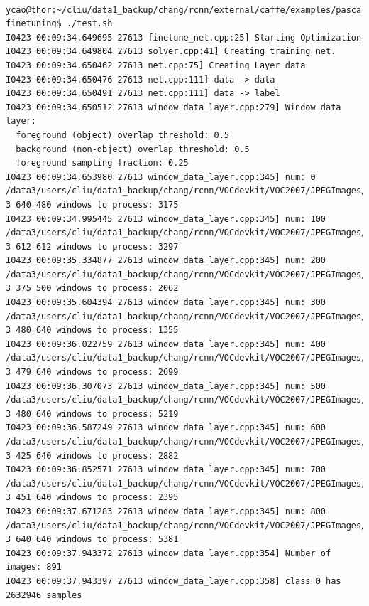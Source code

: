 \documentclass[a4]{article}
\begin{document}
\begin{lstlisting}

ycao@thor:~/cliu/data1_backup/chang/rcnn/external/caffe/examples/pascal-finetuning$ ./test.sh 
I0423 00:09:34.649695 27613 finetune_net.cpp:25] Starting Optimization
I0423 00:09:34.649804 27613 solver.cpp:41] Creating training net.
I0423 00:09:34.650462 27613 net.cpp:75] Creating Layer data
I0423 00:09:34.650476 27613 net.cpp:111] data -> data
I0423 00:09:34.650491 27613 net.cpp:111] data -> label
I0423 00:09:34.650512 27613 window_data_layer.cpp:279] Window data layer:
  foreground (object) overlap threshold: 0.5
  background (non-object) overlap threshold: 0.5
  foreground sampling fraction: 0.25
I0423 00:09:34.653980 27613 window_data_layer.cpp:345] num: 0 /data3/users/cliu/data1_backup/chang/rcnn/VOCdevkit/VOC2007/JPEGImages/COCO_val2014_000000015953.jpg 3 640 480 windows to process: 3175
I0423 00:09:34.995445 27613 window_data_layer.cpp:345] num: 100 /data3/users/cliu/data1_backup/chang/rcnn/VOCdevkit/VOC2007/JPEGImages/COCO_val2014_000000067686.jpg 3 612 612 windows to process: 3297
I0423 00:09:35.334877 27613 window_data_layer.cpp:345] num: 200 /data3/users/cliu/data1_backup/chang/rcnn/VOCdevkit/VOC2007/JPEGImages/COCO_val2014_000000134278.jpg 3 375 500 windows to process: 2062
I0423 00:09:35.604394 27613 window_data_layer.cpp:345] num: 300 /data3/users/cliu/data1_backup/chang/rcnn/VOCdevkit/VOC2007/JPEGImages/COCO_val2014_000000206579.jpg 3 480 640 windows to process: 1355
I0423 00:09:36.022759 27613 window_data_layer.cpp:345] num: 400 /data3/users/cliu/data1_backup/chang/rcnn/VOCdevkit/VOC2007/JPEGImages/COCO_val2014_000000265822.jpg 3 479 640 windows to process: 2699
I0423 00:09:36.307073 27613 window_data_layer.cpp:345] num: 500 /data3/users/cliu/data1_backup/chang/rcnn/VOCdevkit/VOC2007/JPEGImages/COCO_val2014_000000331817.jpg 3 480 640 windows to process: 5219
I0423 00:09:36.587249 27613 window_data_layer.cpp:345] num: 600 /data3/users/cliu/data1_backup/chang/rcnn/VOCdevkit/VOC2007/JPEGImages/COCO_val2014_000000409346.jpg 3 425 640 windows to process: 2882
I0423 00:09:36.852571 27613 window_data_layer.cpp:345] num: 700 /data3/users/cliu/data1_backup/chang/rcnn/VOCdevkit/VOC2007/JPEGImages/COCO_val2014_000000470553.jpg 3 451 640 windows to process: 2395
I0423 00:09:37.671283 27613 window_data_layer.cpp:345] num: 800 /data3/users/cliu/data1_backup/chang/rcnn/VOCdevkit/VOC2007/JPEGImages/COCO_val2014_000000550400.jpg 3 640 640 windows to process: 5381
I0423 00:09:37.943372 27613 window_data_layer.cpp:354] Number of images: 891
I0423 00:09:37.943397 27613 window_data_layer.cpp:358] class 0 has 2632946 samples

\end{lstlisting}
\end{document}
